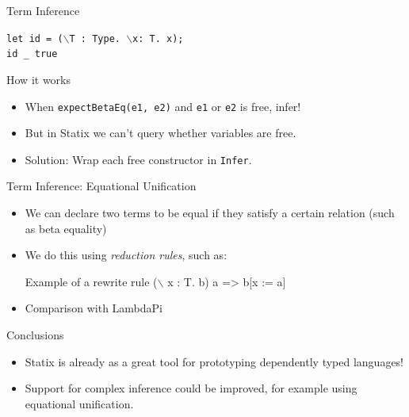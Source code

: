 \documentclass[aspectratio=43]{beamer}
\begin{document}
\begin{frame}{Term Inference}
	\begin{example}\texttt{let id = ($\backslash$T : Type. $\backslash$x: T. x);
	\\id \_ true}
	\end{example}
	\begin{block}{How it works}
		\begin{itemize}
			\item When \texttt{expectBetaEq(e1, e2)} and \texttt{e1} or \texttt{e2} is free, infer!
			\item But in Statix we can't query whether variables are free.
			\item Solution: Wrap each free constructor in \texttt{Infer}.
		\end{itemize}
	\end{block}
\end{frame}

\begin{frame}{Term Inference: Equational Unification}
	\begin{itemize}
		\item We can declare two terms to be equal if they satisfy a certain relation (such as beta equality)
		\item We do this using \emph{reduction rules}, such as:
		\begin{exampleblock}{Example of a rewrite rule}
			($\backslash$ x : T. b) a => b[x := a]
		\end{exampleblock}
		\item Comparison with LambdaPi 
	\end{itemize}
\end{frame}

\begin{frame}[fragile]{Conclusions}
	\begin{itemize}
		\item Statix is already as a great tool for prototyping dependently typed languages!
		\item Support for complex inference could be improved, for example using equational unification.
	\end{itemize}
\end{frame}
\end{document}
